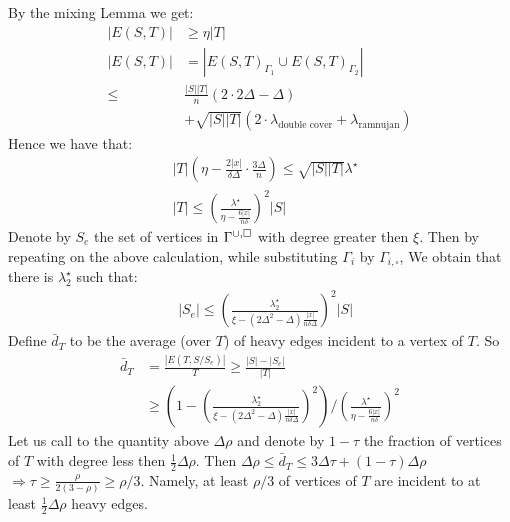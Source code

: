 \documentclass{article}
\begin{document}
\begin{multicols*}{2}
    By the mixing Lemma we get:  
    \begin{equation*}
      \begin{split}
	|E\left( S,T \right)| & \ge \eta |T| \\ 
	|E\left( S,T \right)| & = |E\left( S,T \right)_{\Gamma_{1}} \cup E\left( S,T \right)_{\Gamma_{2}} | \\ 
      \le & \frac{|S||T|}{n}\left( 2 \cdot 2\Delta - \Delta  \right) \\ & + \sqrt{|S||T|}\left( 2\cdot \lambda_{ \text{double cover} } + \lambda_{ \text{ramnujan} }    \right)
      \end{split}
    \end{equation*}
    Hence we have that:
    \begin{equation*}
      \begin{split}
	& |T|\left( \eta - \frac{2|x|}{\delta\Delta}\cdot\frac{3\Delta}{n}  \right)\le \sqrt{|S||T|}\lambda^{\star} \\ 
	& |T| \le \left(\frac{\lambda^{\star}}{\eta - \frac{6|x|}{n \delta}}\right)^{2}|S|
      \end{split}
    \end{equation*}
    Denote by $S_{e}$ the set of vertices in $\Gamma^{\cup, \square}$ with degree greater then $\xi$. Then by repeating on the above calculation, while substituting $\Gamma_{i}$ by $\Gamma_{i, \square}$, We obtain that there is $\lambda^{\star}_{2}$ such that:
     \begin{equation*}
      \begin{split}
	& |S_{e}| \le \left(\frac{\lambda^{\star}_{2}}{\xi - \left(2\Delta^{2} - \Delta  \right)\frac{|x|}{n \delta\Delta}}\right)^{2}|S|
      \end{split}
    \end{equation*}
    Define $\bar{d}_{T}$ to be the average (over $T$) of heavy edges incident to a vertex of $T$. So 
    \begin{equation*}
      \begin{split}
	\bar{d}_{T} &= \frac{|E\left( T, S / S_{e} \right)|}{T} \ge \frac{|S| - |S_{e}|}{|T|} \\
	& \ge \left( 1 -   \left(\frac{\lambda^{\star}_{2}}{\xi - \left(2\Delta^{2} - \Delta  \right)\frac{|x|}{n \delta\Delta}}\right)^{2}\right) /  
	  \left(\frac{\lambda^{\star}}{\eta - \frac{6|x|}{n \delta}}\right)^{2}
      \end{split}
    \end{equation*}
    Let us call to the quantity above $\Delta\rho$ and denote by $1 - \tau$ the fraction of vertices of $ T $ with degree less then $\frac{1}{2}\Delta\rho$. 
 Then $ \Delta\rho \le \bar{d}_{T} \le 3\Delta\tau + \left( 1 - \tau \right) \Delta\rho  $ 
 $ \Rightarrow \tau \ge \frac{\rho}{2\left( 3 - \rho \right)}\ge \rho/3 $. Namely, at least $\rho/3$ of vertices of $T$ are incident to at least $\frac{1}{2}\Delta\rho$ heavy edges. 


\end{multicols*}
\end{document}
